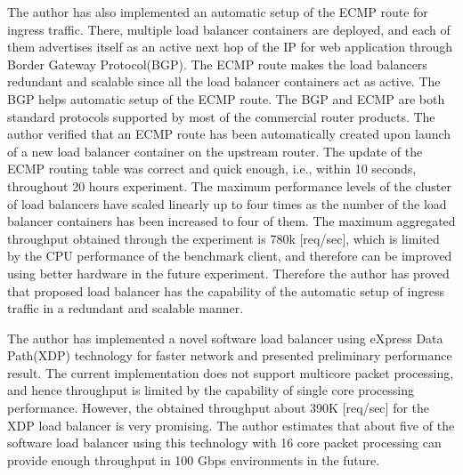 
The author has also implemented an automatic setup of the ECMP route for ingress traffic.
There, multiple load balancer containers are deployed, and each of them advertises itself as an active next hop of the IP for web application through Border Gateway Protocol(BGP).
The ECMP route makes the load balancers redundant and scalable since all the load balancer containers act as active.
The BGP helps automatic setup of the ECMP route.  
The BGP and ECMP are both standard protocols supported by most of the commercial router products.
%
The author verified that an ECMP route has been automatically created upon launch of a new load balancer container on the upstream router.
The update of the ECMP routing table was correct and quick enough, i.e., within 10 seconds, throughout 20 hours experiment.
The maximum performance levels of the cluster of load balancers have scaled linearly up to four times as the number of the load balancer containers has been increased to four of them.
The maximum aggregated throughput obtained through the experiment is 780k [req/sec], which is limited by the CPU performance of the benchmark client, and therefore can be improved using better hardware in the future experiment.
Therefore the author has proved that proposed load balancer has the capability of the automatic setup of ingress traffic in a redundant and scalable manner.


The author has implemented a novel software load balancer using eXpress Data Path(XDP) technology for faster network and presented preliminary performance result.
The current implementation does not support multicore packet processing, and hence throughput is limited by the capability of single core processing performance.
However, the obtained throughput about 390K [req/sec] for the XDP load balancer is very promising.
The author estimates that about five of the software load balancer using this technology with 16 core packet processing can provide enough throughput in 100  Gbps environments in the future. 

